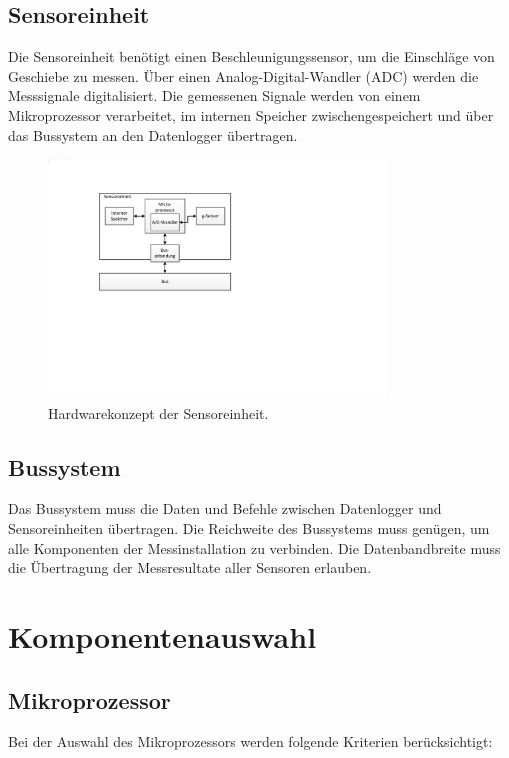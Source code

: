 \subsection{Sensoreinheit}
Die Sensoreinheit benötigt einen Beschleunigungssensor, um die Einschläge von Geschiebe zu messen. Über einen Analog-Digital-Wandler (ADC) werden die Messsignale digitalisiert. Die gemessenen Signale werden von einem Mikroprozessor verarbeitet, im internen Speicher zwischengespeichert und über das Bussystem an den Datenlogger übertragen.

\begin{figure}[H]
	\centering
		\includegraphics[width=0.8\textwidth]{images/visio/hardwarekonzept_sensor.pdf}
	\caption{Hardwarekonzept der Sensoreinheit.}
	\label{fig.hwkonzept_sensor}
\end{figure}

\subsection{Bussystem}
Das Bussystem muss die Daten und Befehle zwischen Datenlogger und Sensoreinheiten übertragen. Die Reichweite des Bussystems muss genügen, um alle Komponenten der Messinstallation zu verbinden. Die Datenbandbreite muss die Übertragung der Messresultate aller Sensoren erlauben.


\section{Komponentenauswahl}

\subsection{Mikroprozessor}
Bei der Auswahl des Mikroprozessors werden folgende Kriterien berücksichtigt:

